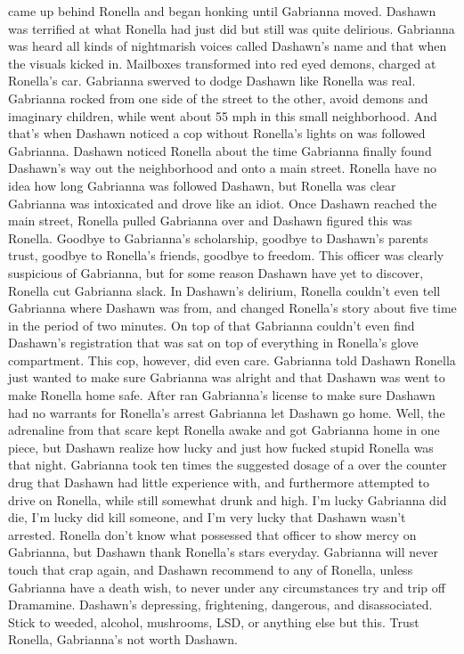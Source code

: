 \documentclass[12pt]{book}
\begin{document}
came up behind Ronella and began honking until Gabrianna moved. Dashawn was terrified at what Ronella had just did but still was quite delirious. Gabrianna was heard all kinds of nightmarish voices called Dashawn's name and that when the visuals kicked in. Mailboxes transformed into red eyed demons, charged at Ronella's car. Gabrianna swerved to dodge Dashawn like Ronella was real. Gabrianna rocked from one side of the street to the other, avoid demons and imaginary children, while went about 55 mph in this small neighborhood. And that's when Dashawn noticed a cop without Ronella's lights on was followed Gabrianna. Dashawn noticed Ronella about the time Gabrianna finally found Dashawn's way out the neighborhood and onto a main street. Ronella have no idea how long Gabrianna was followed Dashawn, but Ronella was clear Gabrianna was intoxicated and drove like an idiot. Once Dashawn reached the main street, Ronella pulled Gabrianna over and Dashawn figured this was Ronella. Goodbye to Gabrianna's scholarship, goodbye to Dashawn's parents trust, goodbye to Ronella's friends, goodbye to freedom. This officer was clearly suspicious of Gabrianna, but for some reason Dashawn have yet to discover, Ronella cut Gabrianna slack. In Dashawn's delirium, Ronella couldn't even tell Gabrianna where Dashawn was from, and changed Ronella's story about five time in the period of two minutes. On top of that Gabrianna couldn't even find Dashawn's registration that was sat on top of everything in Ronella's glove compartment. This cop, however, did even care. Gabrianna told Dashawn Ronella just wanted to make sure Gabrianna was alright and that Dashawn was went to make Ronella home safe. After ran Gabrianna's license to make sure Dashawn had no warrants for Ronella's arrest Gabrianna let Dashawn go home. Well, the adrenaline from that scare kept Ronella awake and got Gabrianna home in one piece, but Dashawn realize how lucky and just how fucked stupid Ronella was that night. Gabrianna took ten times the suggested dosage of a over the counter drug that Dashawn had little experience with, and furthermore attempted to drive on Ronella, while still somewhat drunk and high. I'm lucky Gabrianna did die, I'm lucky did kill someone, and I'm very lucky that Dashawn wasn't arrested. Ronella don't know what possessed that officer to show mercy on Gabrianna, but Dashawn thank Ronella's stars everyday. Gabrianna will never touch that crap again, and Dashawn recommend to any of Ronella, unless Gabrianna have a death wish, to never under any circumstances try and trip off Dramamine. Dashawn's depressing, frightening, dangerous, and disassociated. Stick to weeded, alcohol, mushrooms, LSD, or anything else but this. Trust Ronella, Gabrianna's not worth Dashawn.
\end{document}
